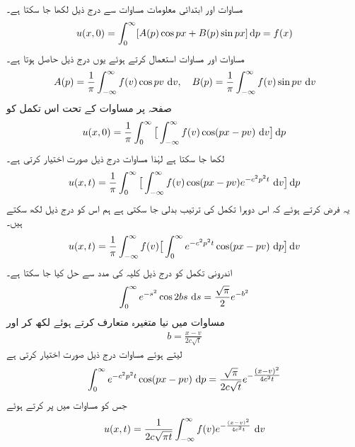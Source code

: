 مساوات  اور ابتدائی معلومات مساوات  سے درج ذیل لکھا جا سکتا ہے۔
\begin{align}\label{مساوات_جزوی_حراری_لامتناہی_ج}
u(x,0)=\int_0^{\infty}[A(p)\cos px+B(p)\sin px]\dif p=f(x)
\end{align}
مساوات  اور مساوات  استعمال کرتے ہوئے یوں درج ذیل حاصل ہوتا ہے۔
\begin{align}\label{مساوات_جزوی_حراری_لامتناہی_چ}
A(p)=\frac{1}{\pi}\int_{-\infty}^{\infty} f(v)\cos pv\,\dif v,\quad B(p)=\frac{1}{\pi}\int_{-\infty}^{\infty} f(v)\sin pv\,\dif v
\end{align}
صفحہ  پر مساوات  کے تحت اس تکمل کو
\begin{align*}
u(x,0)=\frac{1}{\pi}\int_{0}^{\infty} \big[\int_{-\infty}^{\infty} f(v)\cos(px-pv)\,\dif v\big]\dif p
\end{align*}
لکھا جا سکتا ہے لہٰذا مساوات  درج ذیل صورت اختیار کرتی ہے۔
\begin{align*}
u(x,t)=\frac{1}{\pi}\int_0^{\infty}\big[\int_{-\infty}^{\infty}f(v)\cos (px-pv)e^{-c^2p^2t}\,\dif v\big]\dif p
\end{align*}
یہ فرض کرتے ہوئے کہ اس دوہرا تکمل کی ترتیب بدلی جا سکتی ہے ہم اس کو درج ذیل لکھ سکتے ہیں۔
\begin{align}\label{مساوات_جزوی_حراری_لامتناہی_ح}
u(x,t)=\frac{1}{\pi}\int_{-\infty}^{\infty} f(v) \big[\int_0^{\infty}e^{-c^2p^2t}\cos(px-pv)\,\dif p\big]\dif v
\end{align}
اندرونی تکمل کو درج ذیل کلیہ کی مدد سے حل کیا جا سکتا ہے۔
\begin{align}\label{مساوات_جزوی_حراری_لامتناہی_خ}
\int_0^{\infty}e^{-s^2}\cos 2bs\,\dif s=\frac{\sqrt{\pi}}{2}e^{-b^2}
\end{align}
مساوات  میں نیا متغیرہ  متعارف کرتے ہوئے  لکھ کر اور
\begin{align*}
b=\frac{x-v}{2c\sqrt{t}}
\end{align*}
لیتے ہوئے مساوات  درج ذیل صورت اختیار کرتی ہے
\begin{align*}
\int_0^{\infty}e^{-c^2p^2t}\cos (px-pv)\,\dif p=\frac{\sqrt{\pi}}{2c\sqrt{t}}e^{-\tfrac{(x-v)^2}{4c^2t}}
\end{align*}
جس کو مساوات  میں پر کرتے ہوئے 
\begin{align}\label{مساوات_جزوی_لامتناہی_سلاخ_حل_الف}
u(x,t)=\frac{1}{2c\sqrt{\pi t}}\int_{-\infty}^{\infty}f(v)e^{-\frac{(x-v)^2}{4c^2t}}\,\dif v
\end{align}
